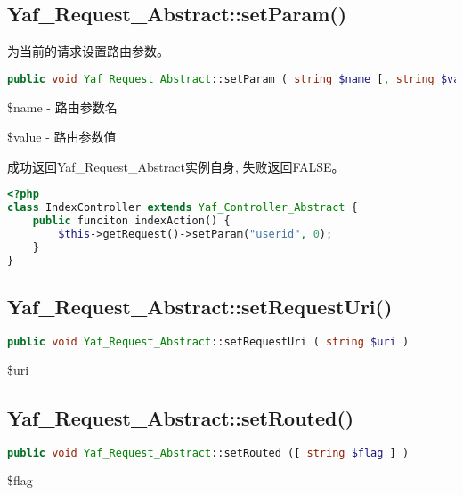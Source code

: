\subsection{Yaf\_Request\_Abstract::setParam()}

为当前的请求设置路由参数。

\begin{lstlisting}[language=PHP]
public void Yaf_Request_Abstract::setParam ( string $name [, string $value ] )
\end{lstlisting}


\begin{compactitem}
\item \$name - 路由参数名
\item \$value - 路由参数值
\end{compactitem}

成功返回Yaf\_Request\_Abstract实例自身, 失败返回FALSE。

\begin{lstlisting}[language=PHP]
<?php
class IndexController extends Yaf_Controller_Abstract {
    public funciton indexAction() {
        $this->getRequest()->setParam("userid", 0);
    }
}
\end{lstlisting}

\subsection{Yaf\_Request\_Abstract::setRequestUri()}


\begin{lstlisting}[language=PHP]
public void Yaf_Request_Abstract::setRequestUri ( string $uri )
\end{lstlisting}

\begin{compactitem}
\item \$uri
\end{compactitem}



\subsection{Yaf\_Request\_Abstract::setRouted()}

\begin{lstlisting}[language=PHP]
public void Yaf_Request_Abstract::setRouted ([ string $flag ] )
\end{lstlisting}

\begin{compactitem}
\item \$flag
\end{compactitem}

